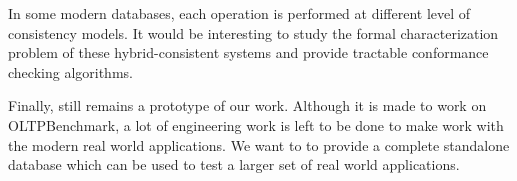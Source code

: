 In some modern databases, each operation is performed at different level of consistency models. It would be interesting to study the formal characterization problem of these hybrid-consistent systems and provide tractable conformance checking algorithms.

Finally, \tool{} still remains a prototype of our work. Although it is made to work on OLTPBenchmark, a lot of engineering work is left to be done to make \tool{} work with the modern real world applications. We want to to provide a complete standalone database which can be used to test a larger set of real world applications. 